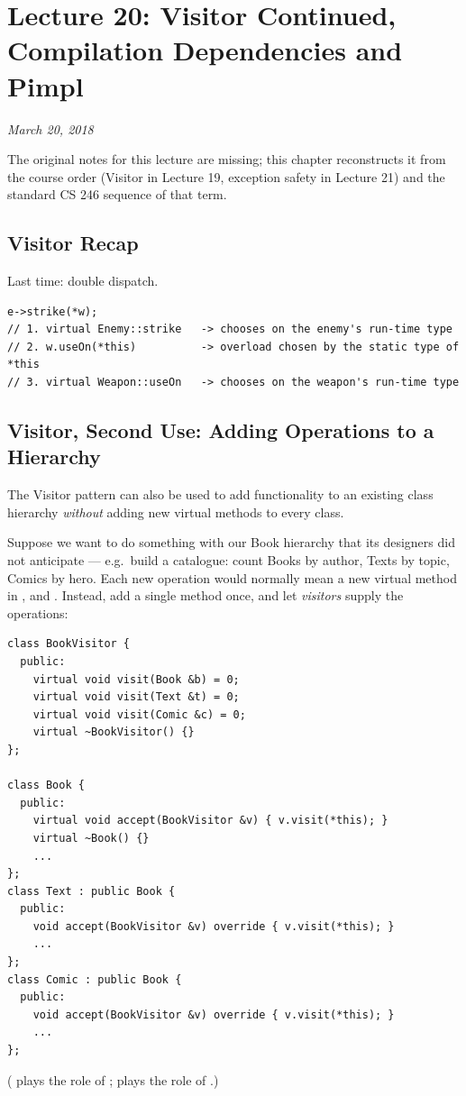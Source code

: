 \chapter{Lecture 20: Visitor Continued, Compilation Dependencies and Pimpl}

\begin{center}
\textit{March 20, 2018}
\end{center}

\begin{aside}
The original notes for this lecture are missing; this chapter reconstructs it
from the course order (Visitor in Lecture 19, exception safety in Lecture 21)
and the standard CS 246 sequence of that term.
\end{aside}

\section{Visitor Recap}
Last time: double dispatch.
\begin{lstlisting}[style=cpp]
e->strike(*w);
// 1. virtual Enemy::strike   -> chooses on the enemy's run-time type
// 2. w.useOn(*this)          -> overload chosen by the static type of *this
// 3. virtual Weapon::useOn   -> chooses on the weapon's run-time type
\end{lstlisting}

\section{Visitor, Second Use: Adding Operations to a Hierarchy}
The Visitor pattern can also be used to add functionality to an existing class
hierarchy \emph{without} adding new virtual methods to every class.

Suppose we want to do something with our Book hierarchy that its designers did
not anticipate --- e.g.\ build a catalogue: count Books by author, Texts by
topic, Comics by hero. Each new operation would normally mean a new virtual
method in ,  and . Instead, add a single
 method once, and let \emph{visitors} supply the operations:
\begin{lstlisting}[style=cpp]
class BookVisitor {
  public:
    virtual void visit(Book &b) = 0;
    virtual void visit(Text &t) = 0;
    virtual void visit(Comic &c) = 0;
    virtual ~BookVisitor() {}
};

class Book {
  public:
    virtual void accept(BookVisitor &v) { v.visit(*this); }
    virtual ~Book() {}
    ...
};
class Text : public Book {
  public:
    void accept(BookVisitor &v) override { v.visit(*this); }
    ...
};
class Comic : public Book {
  public:
    void accept(BookVisitor &v) override { v.visit(*this); }
    ...
};
\end{lstlisting}
( plays the role of ;  plays the role of
.)

